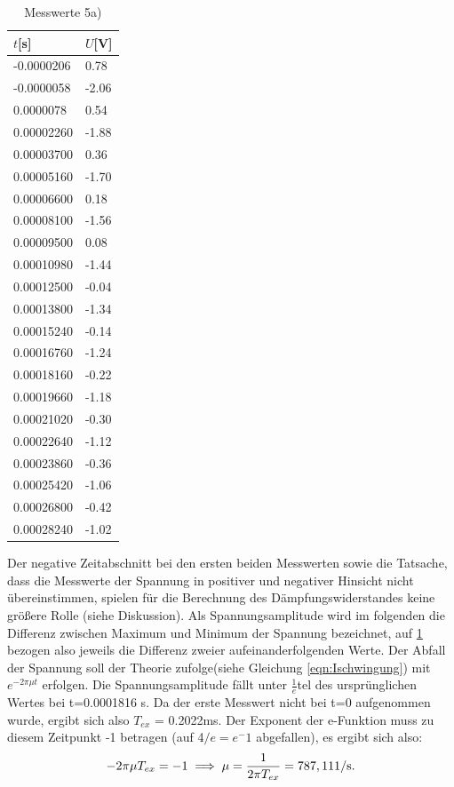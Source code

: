 \begin{table}
\noindent
\caption{Messwerte 5a)}
\label{tab:5a}
\begin{tabular}{ll}
\toprule
{$t$[s]} & {$U$[V]} \\
\midrule
-0.0000206 & 0.78 \\
-0.0000058 & -2.06 \\
0.0000078 & 0.54 \\
0.00002260 & -1.88 \\
0.00003700 & 0.36 \\
0.00005160 & -1.70 \\
0.00006600 & 0.18 \\
0.00008100 & -1.56 \\
0.00009500 & 0.08 \\
0.00010980 & -1.44 \\
0.00012500 & -0.04 \\
0.00013800 & -1.34 \\
0.00015240 & -0.14 \\
0.00016760 & -1.24 \\
0.00018160 & -0.22 \\
0.00019660 & -1.18 \\
0.00021020 & -0.30 \\
0.00022640 & -1.12 \\
0.00023860 & -0.36 \\
0.00025420 & -1.06 \\
0.00026800 & -0.42 \\
0.00028240 & -1.02 \\
\bottomrule
\end{tabular}
\end{table}

Der negative Zeitabschnitt bei den ersten beiden Messwerten
sowie die Tatsache, dass
die Messwerte der Spannung
in positiver und negativer Hinsicht nicht übereinstimmen,
spielen für die Berechnung des Dämpfungswiderstandes keine größere Rolle
(siehe Diskussion).
Als Spannungsamplitude wird im folgenden die Differenz zwischen Maximum und
Minimum der Spannung bezeichnet, auf \ref{tab:5a} bezogen also jeweils die
Differenz zweier aufeinanderfolgenden Werte.
Der Abfall der Spannung soll der Theorie
zufolge(siehe Gleichung \ref{eqn:Ischwingung})
mit $e^{-2\pi\mu t}$ erfolgen. Die Spannungsamplitude fällt unter
$\frac{1}{e}$tel des ursprünglichen Wertes bei t=0.0001816 s.
Da der erste Messwert
nicht bei t=0 aufgenommen wurde, ergibt sich also $T_{ex}$ = 0.2022ms.
Der Exponent der e-Funktion muss zu diesem Zeitpunkt -1 betragen (auf 4$/e=e^-1$
abgefallen), es ergibt sich also:
\begin{equation}
  -2\pi\mu T_{ex} = -1 \\
  \implies \mu = \frac{1}{2\pi T_{ex}} = 787,11 \text{1/s.}
\end{equation}

